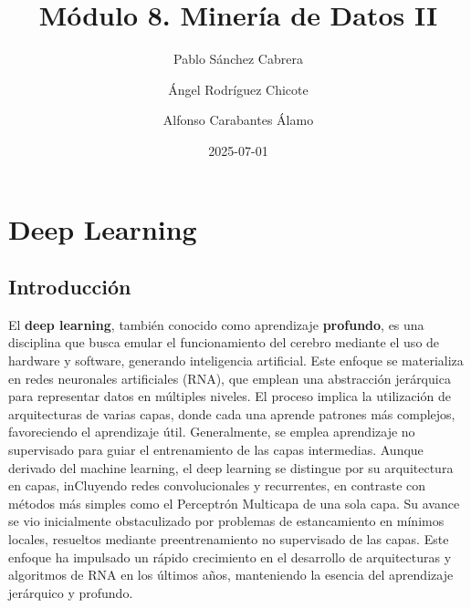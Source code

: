 \documentclass[
  a4paper,
  DIV=11,
  numbers=noendperiod]{scrreprt}
\title{Módulo 8. Minería de Datos II}
\author{Pablo Sánchez Cabrera \and Ángel Rodríguez Chicote \and Alfonso
Carabantes Álamo}
\date{2025-07-01}
\renewcommand{\figurename}{Imagen}
\renewcommand*\contentsname{Table of contents}
\newcommand\contentsname{Table of contents}
\renewcommand*\figurename{Figure}
\newcommand\figurename{Figure}
\begin{document}
\maketitle

\renewcommand{\figurename}{Imagen}


\renewcommand*\contentsname{Índice}
{
\hypersetup{linkcolor=}
\setcounter{tocdepth}{2}
\tableofcontents
}


\chapter*{}\label{section}

\markboth{}{}


\chapter{Deep Learning}\label{deep-learning}

\section{Introducción}\label{introducciuxf3n}

El \textbf{deep learning}, también conocido como aprendizaje
\textbf{profundo}, es una disciplina que busca emular el funcionamiento
del cerebro mediante el uso de hardware y software, generando
inteligencia artificial. Este enfoque se materializa en redes neuronales
artificiales (RNA), que emplean una abstracción jerárquica para
representar datos en múltiples niveles. El proceso implica la
utilización de arquitecturas de varias capas, donde cada una aprende
patrones más complejos, favoreciendo el aprendizaje útil. Generalmente,
se emplea aprendizaje no supervisado para guiar el entrenamiento de las
capas intermedias. Aunque derivado del machine learning, el deep
learning se distingue por su arquitectura en capas, inCluyendo redes
convolucionales y recurrentes, en contraste con métodos más simples como
el Perceptrón Multicapa de una sola capa. Su avance se vio inicialmente
obstaculizado por problemas de estancamiento en mínimos locales,
resueltos mediante preentrenamiento no supervisado de las capas. Este
enfoque ha impulsado un rápido crecimiento en el desarrollo de
arquitecturas y algoritmos de RNA en los últimos años, manteniendo la
esencia del aprendizaje jerárquico y profundo.
\end{document}
